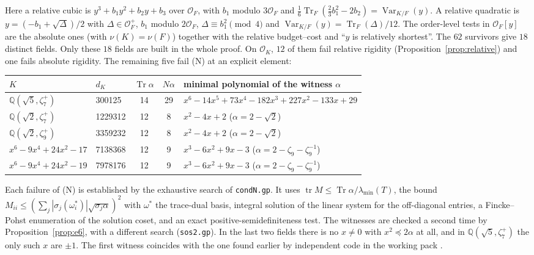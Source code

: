 \documentclass[11pt]{amsart}
\theoremstyle{definition}
\DeclareMathOperator{\Tr}{Tr}
\DeclareMathOperator{\Var}{Var}
\newcommand{\OK}{\mathcal{O}_K}
\newcommand{\OF}{\mathcal{O}_F}
\newcommand{\Q}{\mathbb{Q}}
\newcommand{\file}[1]{\texttt{#1}}
\begin{document}
Here a relative cubic is $y^3+b_1y^2+b_2y+b_3$ over $\OF$, with $b_1$ modulo $3\OF$ and
$\frac16\Tr_F(\frac23b_1^2-2b_2)=\Var_{K/F}(y)$.  A relative quadratic is
$y=(-b_1+\sqrt\Delta)/2$ with $\Delta\in\OF^+$, $b_1$ modulo $2\OF$, $\Delta\equiv b_1^2\pmod4$ and
$\Var_{K/F}(y)=\Tr_F(\Delta)/12$.  The order-level tests in $\OF[y]$ are the absolute ones
(with $\nu(K)=\nu(F)$) together with the relative budget--cost and ``$y$ is relatively
shortest''.  The $62$ survivors give $18$ distinct fields.  Only these $18$ fields are built
in the whole proof.  On $\OK$, $12$ of them fail relative rigidity
(Proposition~\ref{prop:relative}) and one fails absolute rigidity.  The remaining five fail
(N) at an explicit element:

\begin{center}
\begin{tabular}{llccl}
\toprule
$K$ & $d_K$ & $\Tr\alpha$ & $N\alpha$ & minimal polynomial of the witness $\alpha$\\
\midrule
$\Q(\sqrt5,\zeta_7^+)$ & 300125 & 14 & 29 & $x^6-14x^5+73x^4-182x^3+227x^2-133x+29$\\
$\Q(\sqrt2,\zeta_7^+)$ & 1229312 & 12 & 8 & $x^2-4x+2$ \quad($\alpha=2-\sqrt2$)\\
$\Q(\sqrt2,\zeta_9^+)$ & 3359232 & 12 & 8 & $x^2-4x+2$ \quad($\alpha=2-\sqrt2$)\\
$x^6-9x^4+24x^2-17$ & 7138368 & 12 & 9 & $x^3-6x^2+9x-3$ \quad($\alpha=2-\zeta_9-\zeta_9^{-1}$)\\
$x^6-9x^4+24x^2-19$ & 7978176 & 12 & 9 & $x^3-6x^2+9x-3$ \quad($\alpha=2-\zeta_9-\zeta_9^{-1}$)\\
\bottomrule
\end{tabular}
\end{center}

Each failure of (N) is established by the exhaustive search of \file{condN.gp}.  It uses
$\operatorname{tr}M\le\Tr\alpha/\lambda_{\min}(T)$, the bound
$M_{ii}\le(\sum_j|\sigma_j(\omega_i^*)|\sqrt{\sigma_j\alpha})^2$ with $\omega^*$ the
trace-dual basis, integral solution of the linear system for the off-diagonal entries, a
Fincke--Pohst enumeration of the solution coset, and an exact positive-semidefiniteness
test.  The witnesses are checked a second time by Proposition~\ref{prop:e6}, with a
different search (\file{sos2.gp}).  In the last two fields there is no $x\ne0$ with
$x^2\preceq2\alpha$ at all, and in $\Q(\sqrt5,\zeta_7^+)$ the only such $x$ are $\pm1$.
The first witness coincides with the one found earlier by independent code in the working
pack \cite{Pack}.
\end{document}
